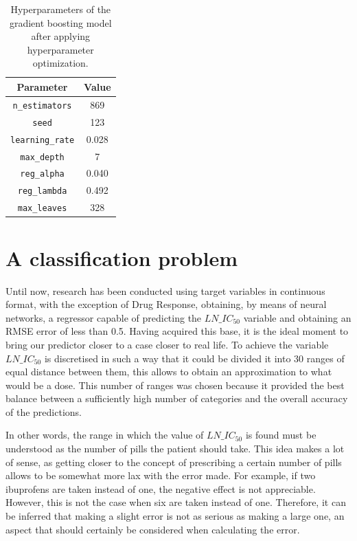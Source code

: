 \begin{table}[H]
    \centering
    \begin{tabular}{|c|c|}
    \hline
    \textbf{Parameter} & \textbf{Value} \\
    \hline
    \texttt{n\_estimators} & 869 \\
    \texttt{seed} & 123 \\
    \texttt{learning\_rate} & 0.028 \\
    \texttt{max\_depth} & 7 \\
    \texttt{reg\_alpha} & 0.040 \\
    \texttt{reg\_lambda} & 0.492 \\
    \texttt{max\_leaves} & 328 \\
    \hline
    \end{tabular}
    \caption{Hyperparameters of the gradient boosting model after applying hyperparameter optimization.}
    \label{tab:gbm_params}
\end{table}

\section{A classification problem}

Until now, research has been conducted using target variables in continuous format, with the exception of Drug Response, obtaining, by means of neural networks, a regressor capable of predicting the \(LN\_IC_{50}\) variable and obtaining an RMSE error of less than 0.5. Having acquired this base, it is the ideal moment to bring our predictor closer to a case closer to real life. To achieve the variable \(LN\_IC_{50}\) is discretised in such a way that it could be divided it into 30 ranges of equal distance between them, this allows to obtain an approximation to what would be a dose. This number of ranges was chosen because it provided the best balance between a sufficiently high number of categories and the overall accuracy of the predictions. 

In other words, the range in which the value of \(LN\_IC_{50}\) is found must be understood as the number of pills the patient should take. This idea makes a lot of sense, as getting closer to the concept of prescribing a certain number of pills allows to be somewhat more lax with the error made. For example, if two ibuprofens are taken instead of one, the negative effect is not appreciable. However, this is not the case when six are taken instead of one. Therefore, it can be inferred that making a slight error is not as serious as making a large one, an aspect that should certainly be considered when calculating the error.

